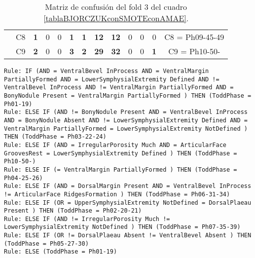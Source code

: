 \begin{table}[H]
{\begin{tabular}{|ccrrrrrrrrrrc|}
\multicolumn{1}{|c|}{}                                      & \multicolumn{1}{c|}{C8} & \multicolumn{1}{c|}{\textbf{1}} & \multicolumn{1}{c|}{0}          & \multicolumn{1}{c|}{0}  & \multicolumn{1}{c|}{\textbf{1}} & \multicolumn{1}{c|}{\textbf{1}} & \multicolumn{1}{c|}{\textbf{12}} & \multicolumn{1}{c|}{\textbf{12}} & \multicolumn{1}{c|}{0}  & \multicolumn{1}{c|}{0}  & \multicolumn{1}{c|}{0}          & C8 = Ph09-45-49   \\ \cline{2-13}
\multicolumn{1}{|c|}{}                                      & \multicolumn{1}{c|}{C9} & \multicolumn{1}{c|}{\textbf{2}} & \multicolumn{1}{c|}{0}          & \multicolumn{1}{c|}{0}  & \multicolumn{1}{c|}{\textbf{3}} & \multicolumn{1}{c|}{\textbf{2}} & \multicolumn{1}{c|}{\textbf{29}} & \multicolumn{1}{c|}{\textbf{32}} & \multicolumn{1}{c|}{0}  & \multicolumn{1}{c|}{0}  & \multicolumn{1}{c|}{\textbf{1}} & C9 = Ph10-50-     \\ \hline
\end{tabular}%
}
\caption{Matriz de confusión del fold 3 del cuadro \ref{tablaBJORCZUKconSMOTEconAMAE}.}

\end{table}

\begin{lstlisting}
Rule: IF (AND = VentralBevel InProcess AND = VentralMargin PartiallyFormed AND = LowerSymphysialExtremity Defined AND != VentralBevel InProcess AND != VentralMargin PartiallyFormed AND = BonyNodule Present = VentralMargin PartiallyFormed ) THEN (ToddPhase = Ph01-19)
Rule: ELSE IF (AND != BonyNodule Present AND = VentralBevel InProcess AND = BonyNodule Absent AND != LowerSymphysialExtremity Defined AND = VentralMargin PartiallyFormed = LowerSymphysialExtremity NotDefined ) THEN (ToddPhase = Ph03-22-24)
Rule: ELSE IF (AND = IrregularPorosity Much AND = ArticularFace GroovesRest = LowerSymphysialExtremity Defined ) THEN (ToddPhase = Ph10-50-)
Rule: ELSE IF (= VentralMargin PartiallyFormed ) THEN (ToddPhase = Ph04-25-26)
Rule: ELSE IF (AND = DorsalMargin Present AND = VentralBevel InProcess != ArticularFace RidgesFormation ) THEN (ToddPhase = Ph06-31-34)
Rule: ELSE IF (OR = UpperSymphysialExtremity NotDefined = DorsalPlaeau Present ) THEN (ToddPhase = Ph02-20-21)
Rule: ELSE IF (AND != IrregularPorosity Much != LowerSymphysialExtremity NotDefined ) THEN (ToddPhase = Ph07-35-39)
Rule: ELSE IF (OR != DorsalPlaeau Absent != VentralBevel Absent ) THEN (ToddPhase = Ph05-27-30)
Rule: ELSE (ToddPhase = Ph01-19)
\end{lstlisting}


